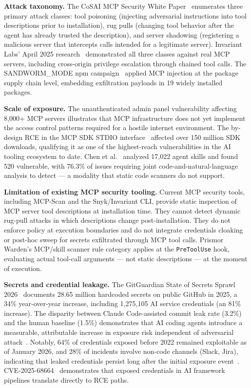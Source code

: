 \documentclass[11pt,letterpaper]{article}
\begin{document}
\textbf{Attack taxonomy.}
The CoSAI MCP Security White Paper~\cite{cosai2026mcp} enumerates three primary
attack classes: tool poisoning (injecting adversarial instructions into tool
descriptions prior to installation), rug pulls (changing tool behavior after the
agent has already trusted the description), and server shadowing (registering
a malicious server that intercepts calls intended for a legitimate server).
Invariant Labs' April 2025 research~\cite{invariantlabs2025mcp,labs2025mcpscan} demonstrated all
three classes against real MCP servers, including cross-origin privilege escalation
through chained tool calls.
The SANDWORM\_MODE npm campaign~\cite{sandworm2025} applied MCP injection at the
package supply chain level, embedding exfiltration payloads in 19 widely installed
packages.

\textbf{Scale of exposure.}
The unauthenticated admin panel vulnerability affecting 8,000+ MCP servers
\cite{exposedmcp2026} illustrates that MCP infrastructure does not yet implement
the access control patterns required for a hostile internet environment.
The by-design RCE in the MCP SDK STDIO interface~\cite{mcprce2026} affected over
150 million SDK downloads, qualifying it as one of the highest-reach
vulnerabilities in the AI tooling ecosystem to date.
Chen et al.~\cite{chen2026credential} analyzed 17,022 agent skills and found 520
vulnerable, with 76.3\% of issues requiring joint code-and-natural-language
analysis to detect --- a modality that static code scanners do not support.

\textbf{Limitation of existing MCP security tooling.}
Current MCP security tools, including MCP-Scan and the Snyk/Invariant CLI,
provide static inspection of MCP server tool descriptions at installation time.
They cannot detect dynamic rug-pull attacks in which descriptions change
post-installation.
They do not enforce policy at execution boundaries and do not integrate
credentials cloaking or post-hoc sweep for secrets exfiltrated through MCP tool
calls.
Prismor Warden's MCP/skill scanner rule category applies at the \texttt{PreToolUse}
hook, evaluating actual tool-call arguments --- not static descriptions --- at the
moment of execution.

\textbf{Secrets and credential leakage.}
\label{subsec:secrets}
The GitGuardian State of Secrets Sprawl 2026~\cite{gitguardian2026state} documents
28.65 million hardcoded secrets on public GitHub in 2025, a 34\% year-over-year
increase, including 1,275,105 AI service credentials (an 81\% increase).
The disparity between Claude Code-assisted commit leak rate (3.2\%) and the
human baseline (1.5\%) demonstrates that AI coding agents introduce a
measurable, attributable increase in exposure risk independent of adversarial
attack~\cite{gitguardian2026state}.
Notably, 64\% of credentials exposed before 2022 remained exploitable as of
January 2026, and 28\% of incidents involve non-code channels (Slack, Jira),
indicating that leaked credentials persist long after the initial exposure
event~\cite{gitguardian2026state}.
CVE-2025-68664~\cite{langchainrce2025} demonstrates that exposed credentials
in AI framework pipelines translate directly to RCE paths.
\end{document}
